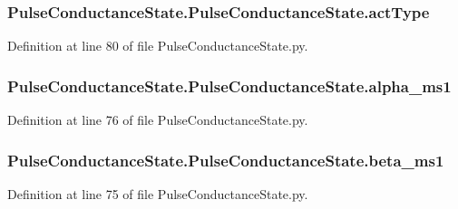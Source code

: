 \subsubsection[{\texorpdfstring{act\+Type}{actType}}]{\setlength{\rightskip}{0pt plus 5cm}Pulse\+Conductance\+State.\+Pulse\+Conductance\+State.\+act\+Type}\hypertarget{class_pulse_conductance_state_1_1_pulse_conductance_state_a0677d7b972a6f6a12abc666212a12297}{}\label{class_pulse_conductance_state_1_1_pulse_conductance_state_a0677d7b972a6f6a12abc666212a12297}


Definition at line 80 of file Pulse\+Conductance\+State.\+py.

\subsubsection[{\texorpdfstring{alpha\+\_\+ms1}{alpha_ms1}}]{\setlength{\rightskip}{0pt plus 5cm}Pulse\+Conductance\+State.\+Pulse\+Conductance\+State.\+alpha\+\_\+ms1}\hypertarget{class_pulse_conductance_state_1_1_pulse_conductance_state_a5fe4e2c9035df43a1e8eb9d66d669e14}{}\label{class_pulse_conductance_state_1_1_pulse_conductance_state_a5fe4e2c9035df43a1e8eb9d66d669e14}


Definition at line 76 of file Pulse\+Conductance\+State.\+py.

\subsubsection[{\texorpdfstring{beta\+\_\+ms1}{beta_ms1}}]{\setlength{\rightskip}{0pt plus 5cm}Pulse\+Conductance\+State.\+Pulse\+Conductance\+State.\+beta\+\_\+ms1}\hypertarget{class_pulse_conductance_state_1_1_pulse_conductance_state_a8ebc0c29d97fa09699d7dfb724e94f82}{}\label{class_pulse_conductance_state_1_1_pulse_conductance_state_a8ebc0c29d97fa09699d7dfb724e94f82}


Definition at line 75 of file Pulse\+Conductance\+State.\+py.

